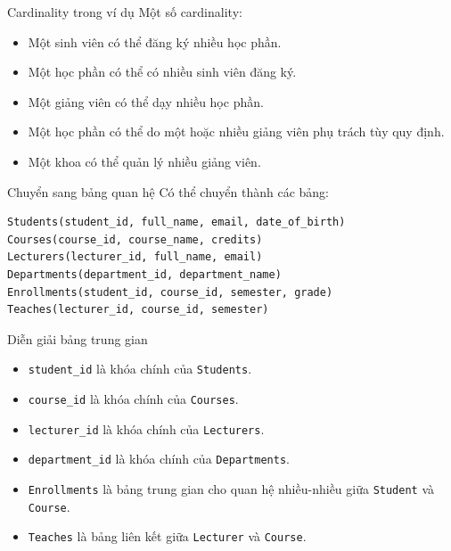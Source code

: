 \documentclass[aspectratio=169,11pt]{beamer}
\newcommand{\smallitem}{\setlength{\itemsep}{2pt}\setlength{\parskip}{0pt}}
\begin{document}
\begin{frame}{Cardinality trong ví dụ}
\small
Một số cardinality:
\begin{itemize}
\smallitem
  \item Một sinh viên có thể đăng ký nhiều học phần.
  \item Một học phần có thể có nhiều sinh viên đăng ký.
  \item Một giảng viên có thể dạy nhiều học phần.
  \item Một học phần có thể do một hoặc nhiều giảng viên phụ trách tùy quy định.
  \item Một khoa có thể quản lý nhiều giảng viên.
\end{itemize}
\end{frame}

\begin{frame}[fragile]{Chuyển sang bảng quan hệ}
\small
Có thể chuyển thành các bảng:
\begin{verbatim}
Students(student_id, full_name, email, date_of_birth)
Courses(course_id, course_name, credits)
Lecturers(lecturer_id, full_name, email)
Departments(department_id, department_name)
Enrollments(student_id, course_id, semester, grade)
Teaches(lecturer_id, course_id, semester)
\end{verbatim}
\end{frame}

\begin{frame}{Diễn giải bảng trung gian}
\small
\begin{itemize}
\smallitem
  \item \texttt{student\_id} là khóa chính của \texttt{Students}.
  \item \texttt{course\_id} là khóa chính của \texttt{Courses}.
  \item \texttt{lecturer\_id} là khóa chính của \texttt{Lecturers}.
  \item \texttt{department\_id} là khóa chính của \texttt{Departments}.
  \item \texttt{Enrollments} là bảng trung gian cho quan hệ nhiều-nhiều giữa \texttt{Student} và \texttt{Course}.
  \item \texttt{Teaches} là bảng liên kết giữa \texttt{Lecturer} và \texttt{Course}.
\end{itemize}
\end{frame}
\end{document}
